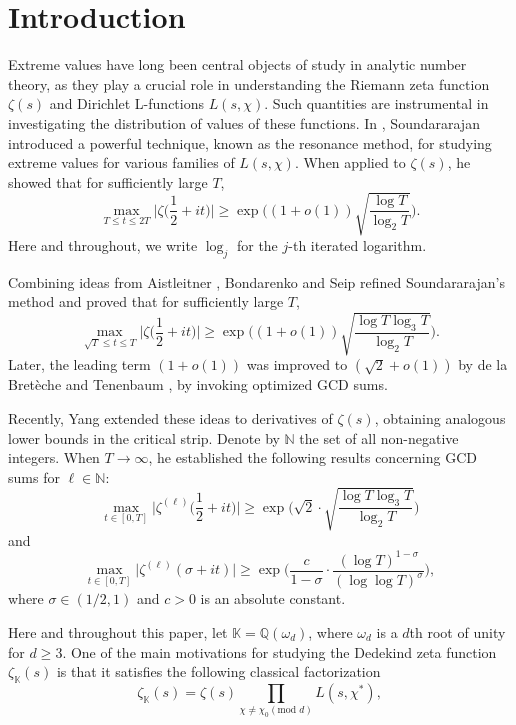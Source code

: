 \documentclass[12pt,reqno]{amsart}
\theoremstyle{definition}
\numberwithin{equation}{section}
\newcommand{\mbk}{\mathbb{K}}
\newcommand{\mbn}{\mathbb{N}}
\newcommand{\mbq}{\mathbb{Q}}
\begin{document}
\section{Introduction}
\label{Introduction}
Extreme values have long been central objects of study in analytic number theory, as they play a crucial role in understanding the Riemann zeta function $\zeta(s)$ and Dirichlet L-functions $L(s,\chi)$. Such quantities are instrumental in investigating the distribution of values of these functions. In \cite{soundararajan2008extreme}, Soundararajan introduced a powerful technique, known as the resonance method, for studying extreme values for various families of $L(s, \chi)$. When applied to $\zeta(s)$, he showed that for sufficiently large $T$,
$$
\max_{T \le t \le 2T} \Big|\zeta\Big(\frac{1}{2}+it\Big)\Big| \ge \exp\bigg((1 + o(1))\sqrt{\frac{\log T}{\log_2 T}}\bigg).
$$
Here and throughout, we write $\log_j$ for the $j$-th iterated logarithm.
\par
Combining ideas from Aistleitner \cite{aistleitner2016lower}, Bondarenko and Seip \cite{bondarenko2017large,bondarenko2018argument} refined Soundararajan's method and proved that for sufficiently large $T$,
$$
\max_{\sqrt{T} \le t \le T} \Big| \zeta\Big( \frac{1}{2} + it \Big) \Big| \geq \exp\bigg( (1+o(1)) \sqrt{ \frac{\log T \log_3 T}{\log_2 T} } \bigg).
$$
Later, the leading term $(1+o(1))$ was improved to $(\sqrt{2}+o(1))$ by de la Bretèche and Tenenbaum \cite{tenen2019galsum}, by invoking optimized GCD sums.
\par
Recently, Yang \cite{yang2022extreme,yang2024extreme} extended these ideas to derivatives of $\zeta(s)$, obtaining analogous lower bounds in the critical strip. Denote by $\mbn$ the set of all non-negative integers. When $T \to \infty$, he established the following results concerning GCD sums for $\ell \in \mbn$:
$$\max _{t \in[0, T]}\Big|\zeta^{(\ell)}\Big(\frac{1}{2}+i t\Big)\Big| \ge\exp \bigg(\sqrt{2} \cdot\sqrt{\frac{\log T \log_3 T}{\log_2T}}\bigg)$$
and
$$\max _{t \in[0, T]}\Big|\zeta^{(\ell)}(\sigma+i t)\Big| \ge \exp \bigg(\frac{c}{1-\sigma} \cdot \frac{(\log T)^{1-\sigma}}{(\log \log T)^\sigma}\bigg),$$
where $\sigma \in (1/2, 1)$ and $c>0$ is an absolute constant.
\par
Here and throughout this paper, let $\mbk = \mbq(\omega_d)$, where $\omega_d$ is a $d$th root of unity for $d \ge 3$. One of the main motivations for studying the Dedekind zeta function $\zeta_\mbk(s)$ is that it satisfies the following classical factorization
\begin{equation*}
    \zeta_\mbk(s)=\zeta(s)\prod_{\chi\neq\chi_{0}(\text{mod }d)}L(s,\chi^{\ast}),
\end{equation*}
\end{document}
